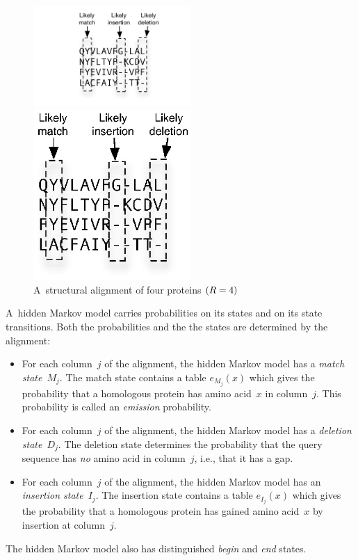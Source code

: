 \documentclass[preprint,nonatbib,blockstyle,nocopyrightspace,times]{sigplanconf}
\newcommand\alignwidth{\ensuremath R} %
\begin{document}
\begin{figure}
\ifpdfmadness
\centerline{\includegraphics[width=6cm]{alignment.pdf}} 
\else
\centerline{\includegraphics[width=6cm]{alignment.eps}} 
\fi



\caption{A~structural alignment of four proteins $(\alignwidth = 4)$}
\label{alignment} 
\end{figure}

A~hidden Markov model carries probabilities on its states and on its
state transitions.
Both the probabilities and the
the states are determined by the alignment:
\begin{itemize}
\item
For each column~$j$ of the alignment, the hidden Markov model has a
\emph{match state}~$M_j$.
The match state contains a table $e_{M_j}(x)$ which gives the
 probability that a homologous protein has amino acid~$x$ in
 column~$j$.
This probability is called an \emph{emission} probability.
\item
For each column~$j$ of the alignment, the hidden Markov model has a
\emph{deletion state}~$D_j$.
The deletion state determines the probability that the query sequence
has \emph{no} amino acid  in column~$j$, i.e., that it has a gap.
\item 
For each column~$j$ of the alignment, the hidden Markov model has an
\emph{insertion state}~$I_j$.
The insertion state contains a table $e_{I_j}(x)$ which gives the
probability that a homologous protein has gained amino acid~$x$ by
insertion at column~$j$.
\end{itemize}
The hidden Markov model also has distinguished \emph{begin} and \emph{end} states.
\end{document}
